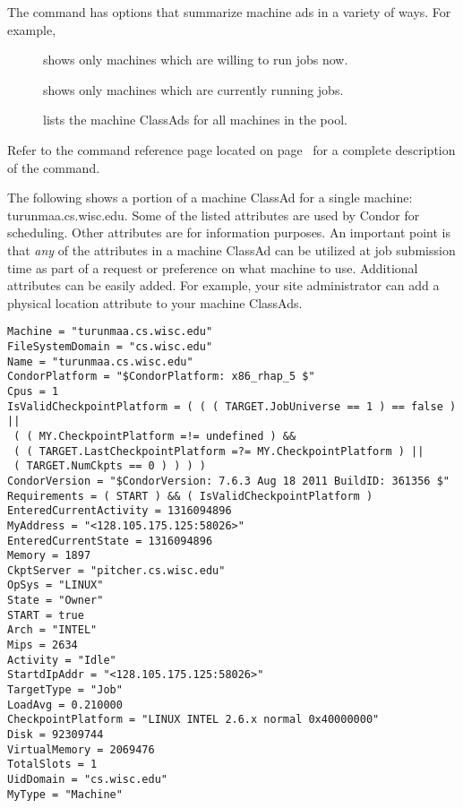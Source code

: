 The  command has options that summarize machine ads 
in a variety of ways.
For example,
\begin{description}
\item[] shows only machines which are
willing to run jobs now. 
\item[] shows only machines
which are currently running jobs.  
\item[] lists the machine ClassAds for all machines
in the pool.
\end{description}

Refer to the  command 
reference page located on page~\pageref{man-condor-status}
for a complete description of the  command.

The following shows a portion of a machine ClassAd
for a single machine: turunmaa.cs.wisc.edu. Some of the listed
attributes are used by
Condor for scheduling. Other attributes are for information purposes.
An important point is that \emph{any} of the attributes in a
machine ClassAd can be utilized at job submission time as part of a request
or preference on what machine to use. Additional attributes
can be easily added. For example, your site administrator can
add a physical location attribute to your machine ClassAds.


\footnotesize
\begin{verbatim}
Machine = "turunmaa.cs.wisc.edu"
FileSystemDomain = "cs.wisc.edu"
Name = "turunmaa.cs.wisc.edu"
CondorPlatform = "$CondorPlatform: x86_rhap_5 $"
Cpus = 1
IsValidCheckpointPlatform = ( ( ( TARGET.JobUniverse == 1 ) == false ) || 
 ( ( MY.CheckpointPlatform =!= undefined ) && 
 ( ( TARGET.LastCheckpointPlatform =?= MY.CheckpointPlatform ) || 
 ( TARGET.NumCkpts == 0 ) ) ) )
CondorVersion = "$CondorVersion: 7.6.3 Aug 18 2011 BuildID: 361356 $"
Requirements = ( START ) && ( IsValidCheckpointPlatform )
EnteredCurrentActivity = 1316094896
MyAddress = "<128.105.175.125:58026>"
EnteredCurrentState = 1316094896
Memory = 1897
CkptServer = "pitcher.cs.wisc.edu"
OpSys = "LINUX"
State = "Owner"
START = true
Arch = "INTEL"
Mips = 2634
Activity = "Idle"
StartdIpAddr = "<128.105.175.125:58026>"
TargetType = "Job"
LoadAvg = 0.210000
CheckpointPlatform = "LINUX INTEL 2.6.x normal 0x40000000"
Disk = 92309744
VirtualMemory = 2069476
TotalSlots = 1
UidDomain = "cs.wisc.edu"
MyType = "Machine"
\end{verbatim}
\normalsize


